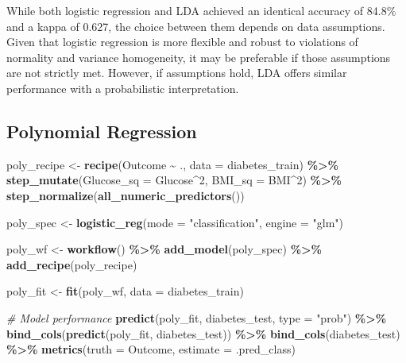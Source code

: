 \documentclass[
]{article}
\newenvironment{Shaded}{\begin{snugshade}}{\end{snugshade}}
\newcommand{\AttributeTok}[1]{\textcolor[rgb]{0.13,0.29,0.53}{#1}}
\newcommand{\CommentTok}[1]{\textcolor[rgb]{0.56,0.35,0.01}{\textit{#1}}}
\newcommand{\DecValTok}[1]{\textcolor[rgb]{0.00,0.00,0.81}{#1}}
\newcommand{\FunctionTok}[1]{\textcolor[rgb]{0.13,0.29,0.53}{\textbf{#1}}}
\newcommand{\NormalTok}[1]{#1}
\newcommand{\OtherTok}[1]{\textcolor[rgb]{0.56,0.35,0.01}{#1}}
\newcommand{\SpecialCharTok}[1]{\textcolor[rgb]{0.81,0.36,0.00}{\textbf{#1}}}
\newcommand{\StringTok}[1]{\textcolor[rgb]{0.31,0.60,0.02}{#1}}
\begin{document}
While both logistic regression and LDA achieved an identical accuracy of
84.8\% and a kappa of 0.627, the choice between them depends on data
assumptions. Given that logistic regression is more flexible and robust
to violations of normality and variance homogeneity, it may be
preferable if those assumptions are not strictly met. However, if
assumptions hold, LDA offers similar performance with a probabilistic
interpretation.

\subsection{Polynomial Regression}\label{polynomial-regression}

\begin{Shaded}
\begin{Highlighting}[]
\NormalTok{poly\_recipe }\OtherTok{\textless{}{-}} \FunctionTok{recipe}\NormalTok{(Outcome }\SpecialCharTok{\textasciitilde{}}\NormalTok{ ., }\AttributeTok{data =}\NormalTok{ diabetes\_train) }\SpecialCharTok{\%\textgreater{}\%}
  \FunctionTok{step\_mutate}\NormalTok{(}\AttributeTok{Glucose\_sq =}\NormalTok{ Glucose}\SpecialCharTok{\^{}}\DecValTok{2}\NormalTok{, }\AttributeTok{BMI\_sq =}\NormalTok{ BMI}\SpecialCharTok{\^{}}\DecValTok{2}\NormalTok{) }\SpecialCharTok{\%\textgreater{}\%}
  \FunctionTok{step\_normalize}\NormalTok{(}\FunctionTok{all\_numeric\_predictors}\NormalTok{())}

\NormalTok{poly\_spec }\OtherTok{\textless{}{-}} \FunctionTok{logistic\_reg}\NormalTok{(}\AttributeTok{mode =} \StringTok{"classification"}\NormalTok{, }\AttributeTok{engine =} \StringTok{"glm"}\NormalTok{)}

\NormalTok{poly\_wf }\OtherTok{\textless{}{-}} \FunctionTok{workflow}\NormalTok{() }\SpecialCharTok{\%\textgreater{}\%}
  \FunctionTok{add\_model}\NormalTok{(poly\_spec) }\SpecialCharTok{\%\textgreater{}\%}
  \FunctionTok{add\_recipe}\NormalTok{(poly\_recipe)}

\NormalTok{poly\_fit }\OtherTok{\textless{}{-}} \FunctionTok{fit}\NormalTok{(poly\_wf, }\AttributeTok{data =}\NormalTok{ diabetes\_train)}

\CommentTok{\# Model performance}
\FunctionTok{predict}\NormalTok{(poly\_fit, diabetes\_test, }\AttributeTok{type =} \StringTok{"prob"}\NormalTok{) }\SpecialCharTok{\%\textgreater{}\%}
  \FunctionTok{bind\_cols}\NormalTok{(}\FunctionTok{predict}\NormalTok{(poly\_fit, diabetes\_test)) }\SpecialCharTok{\%\textgreater{}\%}
  \FunctionTok{bind\_cols}\NormalTok{(diabetes\_test) }\SpecialCharTok{\%\textgreater{}\%}
  \FunctionTok{metrics}\NormalTok{(}\AttributeTok{truth =}\NormalTok{ Outcome, }\AttributeTok{estimate =}\NormalTok{ .pred\_class)}
\end{Highlighting}
\end{Shaded}
\end{document}

